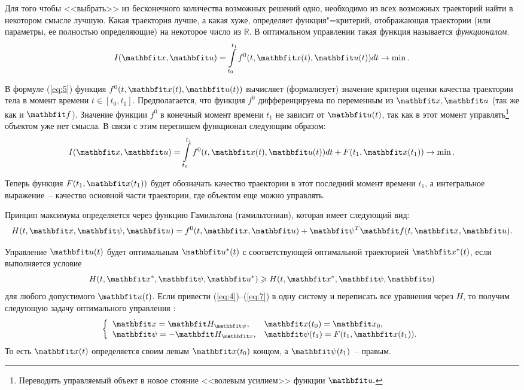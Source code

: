 \documentclass[a4paper,14pt, openany, twoside, draft]{extbook} %
\begin{document}
Для того чтобы <<выбрать>> из бесконечного количества возможных решений одно, необходимо из всех возможных траекторий найти в некотором смысле лучшую.  Какая траектория лучше, а какая хуже, определяет функция"=критерий, отображающая траектории (или параметры, ее полностью определяющие) на некоторое число из $\mathbb{R}$.  В оптимальном управлении такая функция называется \emph{функционалом}.
\begin{equation}
  \label{eq:5}
  I(\vecx,\vecu)=\int\limits_{t_0}^{t_1}f^0(t,\vecx(t),\vecu(t))dt \to \min.
\end{equation}

В формуле (\ref{eq:5}) функция $f^0(t,\vecx(t),\vecu(t))$ вычисляет (формализует) значение критерия оценки качества траектории тела в момент времени $t\in[t_0,t_1]$.  Предполагается, что функция $f^0$ дифференцируема по переменным из $\vecx,\vecu$ (так же как и $\vecf$).  Значение функции $f^0$ в конечный момент времени $t_1$ не зависит от $\vecu(t)$, так как в этот момент управлять\footnote{Переводить управляемый объект в новое стояние <<волевым усилием>> функции $\vecu.$} объектом уже нет смысла.  В связи с этим перепишем функционал следующим образом:
\begin{equation}
  \label{eq:6}
  I(\vecx,\vecu)=\int\limits_{t_0}^{t_1}f^0(t,\vecx(t),\vecu(t))dt+F(t_1,\vecx(t_1)) \to \min.
\end{equation}

\noindent{}Теперь функция $F(t_1,\vecx(t_1))$ будет обозначать качество траектории в этот последний момент времени $t_1$, а интегральное выражение~-- качество основной части траектории, где объектом еще можно управлять.

Принцип максимума определяется через функцию Гамильтона (гамильтониан), которая имеет следующий вид:
\begin{equation}
  \label{eq:7}
  H(t,\vecx,\vecpsi,\vecu)=f^0(t,\vecx,\vecu)+\vecpsi^T\vecf(t,\vecx,\vecu).
\end{equation}

Управление $\vecu(t)$ будет оптимальным $\vecu^*(t)$ с соответствующей оптимальной траекторией $\vecx^*(t)$, если выполняется условие
\begin{equation}
  \label{eq:7}
  H(t,\vecx^*,\vecpsi,\vecu^*)\geqslant H(t,\vecx^*,\vecpsi,\vecu)
\end{equation}
для любого допустимого $\vecu(t)$.  Если привести (\ref{eq:4})--(\ref{eq:7}) в одну систему и переписать все уравнения через $H$, то получим следующую задачу оптимального управления \cite{sethi}:
\begin{equation}
  \label{eq:8}
  \left\{
    \begin{array}{ll}
      \dot{\vecx}=\vecH_{\vecpsi}, & \vecx(t_0)=\vecx_0,\\
      \dot{\vecpsi}=-\vecH_{\vecx}, & \vecpsi(t_1)=F(t_1,\vecx(t_1)).
    \end{array}
  \right.
\end{equation}
То есть $\vecx(t)$ определяется своим левым $\vecx(t_0)$ концом, а $\vecpsi(t_1)$~-- правым.
\end{document}
